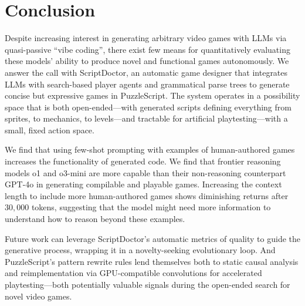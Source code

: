 \documentclass[conference]{IEEEtran}
\begin{document}
\section{Conclusion}

Despite increasing interest in generating arbitrary video games with LLMs via quasi-passive ``vibe coding'', there exist few means for quantitatively evaluating these models' ability to produce novel and functional games autonomously. We answer the call with ScriptDoctor, an automatic game designer that integrates LLMs with search-based player agents and grammatical parse trees to generate concise but expressive games in PuzzleScript. The system operates in a possibility space that is both open-ended---with generated scripts defining everything from sprites, to mechanics, to levels---and tractable for artificial playtesting---with a small, fixed action space.

We find that using few-shot prompting with examples of human-authored games increases the functionality of generated code. We find that frontier reasoning models o1 and o3-mini are more capable than their non-reasoning counterpart GPT-4o in generating compilable and playable games. Increasing the context length to include more human-authored games shows diminishing returns after $30,000$ tokens, suggesting that the model might need more information to understand how to reason beyond these examples.

Future work can leverage ScriptDoctor's automatic metrics of quality to guide the generative process, wrapping it in a novelty-seeking evolutionary loop. And PuzzleScript's pattern rewrite rules lend themselves both to static causal analysis and reimplementation via GPU-compatible convolutions for accelerated playtesting---both potentially valuable signals during the open-ended search for novel video games.






\end{document}
